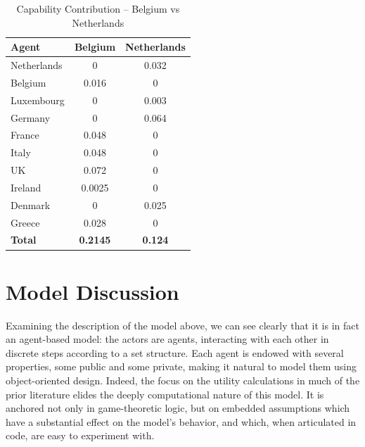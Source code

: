 \begin{table}[h!]
\centering
    \caption{Capability Contribution -- Belgium vs Netherlands}
    \label{table:contributions}
\begin{tabular}{lcc}
    \hline
    Agent &  Belgium & Netherlands \\
    \hline
    Netherlands & 0 & 0.032 \\
    Belgium & 0.016 & 0 \\
    Luxembourg & 0 & 0.003 \\
    Germany & 0 & 0.064 \\
    France & 0.048 & 0 \\
    Italy & 0.048 & 0 \\
    UK & 0.072 & 0 \\
    Ireland & 0.0025 & 0 \\
    Denmark & 0 & 0.025 \\
    Greece & 0.028 & 0 \\
    \textbf{Total} & \textbf{0.2145} & \textbf{0.124} \\
    \hline
\end{tabular}
\tableSpace

\end{table}


\section{Model Discussion} \label{bdm_discussion}

Examining the description of the model above, we can see clearly that it is in fact an agent-based model: the actors are agents, interacting with each other in discrete steps according to a set structure. Each agent is endowed with several properties, some public and some private, making it natural to model them using object-oriented design. Indeed, the focus on the utility calculations in much of the prior literature elides the deeply computational nature of this model. It is anchored not only in game-theoretic logic, but on embedded assumptions which have a substantial effect on the model's behavior, and which, when articulated in code, are easy to experiment with. 

